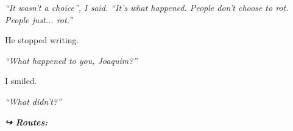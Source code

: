 \noindent \textit{\textquotedblleft{}It wasn't a choice\textquotedblright{}\textit{, I said. }\textquotedblleft{}It's what happened. People don't choose to rot. People just... rot.\textquotedblright{}}

\noindent He stopped writing.

\noindent \textit{\textquotedblleft{}What happened to you, Joaquim?\textquotedblright{}}

\noindent I smiled.

\noindent \textit{\textquotedblleft{}What didn't?\textquotedblright{}}

\vspace{0.5em}
\noindent\textit{\textbf{↪ Routes:}  \rotasep {} \rotasep {}}
